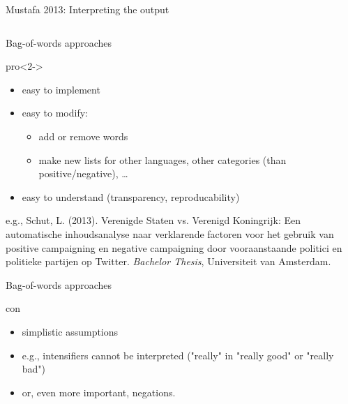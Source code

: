\documentclass{beamer}
\begin{document}
\begin{frame}{Mustafa 2013: Interpreting the output}

\begin{columns}
\end{columns}
\end{frame}



\begin{frame}{Bag-of-words approaches}
\begin{block}{pro}<2->
\begin{itemize}
\item easy to implement
\item easy to modify:
\begin{itemize}
\item add or remove words
\item make new lists for other languages, other categories (than positive/negative), \dots
\end{itemize}
\item easy to understand (transparency, reproducability)
\end{itemize}
\end{block}
\par
\tiny{e.g., Schut, L. (2013). Verenigde Staten vs. Verenigd Koningrijk: Een automatische inhoudsanalyse naar verklarende factoren voor het gebruik van positive campaigning en negative campaigning door vooraanstaande politici en politieke partijen op Twitter. \emph{Bachelor Thesis}, Universiteit van Amsterdam.}\\
\end{frame}



\begin{frame}{Bag-of-words approaches}
\begin{block}{con}
\begin{itemize}
\item simplistic assumptions
\item e.g., intensifiers cannot be interpreted ("really" in "really good" or "really bad")
\item or, even more important, negations.
\end{itemize}
\end{block}
\end{frame}
\end{document}
